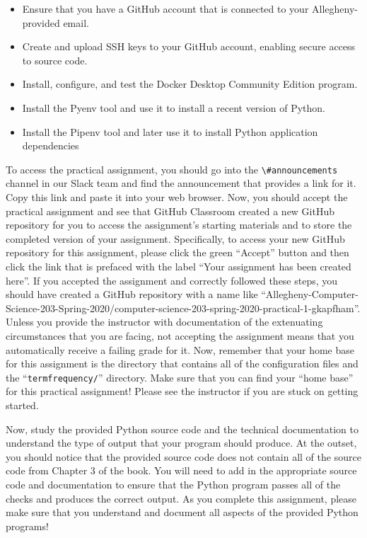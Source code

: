 \documentclass[11pt]{article}
\newcommand{\command}[1]{``\lstinline{#1}''}
\newcommand{\channel}[1]{\lstinline{#1}}
\begin{document}
\begin{itemize}
  \setlength{\itemsep}{0pt}

  \item Ensure that you have a GitHub account that is connected to your
    Allegheny-provided email.

  \item Create and upload SSH keys to your GitHub account, enabling secure
    access to source code.

  \item Install, configure, and test the Docker Desktop Community
    Edition program.

  \item Install the Pyenv tool and use it to install a recent version of Python.

  \item Install the Pipenv tool and later use it to install Python application
    dependencies

\end{itemize}

To access the practical assignment, you should go into the
\channel{\#announcements} channel in our Slack team and find the announcement
that provides a link for it. Copy this link and paste it into your web browser.
Now, you should accept the practical assignment and see that GitHub Classroom
created a new GitHub repository for you to access the assignment's starting
materials and to store the completed version of your assignment. Specifically,
to access your new GitHub repository for this assignment, please click the green
``Accept'' button and then click the link that is prefaced with the label ``Your
assignment has been created here''. If you accepted the assignment and correctly
followed these steps, you should have created a GitHub repository with a name
like
``Allegheny-Computer-Science-203-Spring-2020/computer-science-203-spring-2020-practical-1-gkapfham''.
Unless you provide the instructor with documentation of the extenuating
circumstances that you are facing, not accepting the assignment means that you
automatically receive a failing grade for it. Now, remember that your home base
for this assignment is the directory that contains all of the configuration
files and the \command{termfrequency/} directory. Make sure that you can find
your ``home base'' for this practical assignment! Please see the instructor if
you are stuck on getting started.

Now, study the provided Python source code and the technical documentation to
understand the type of output that your program should produce.
%
At the outset, you should notice that the provided source code does not contain
all of the source code from Chapter 3 of the book. You will need to add in the
appropriate source code and documentation to ensure that the Python program
passes all of the checks and produces the correct output. As you complete this
assignment, please make sure that you understand and document all aspects of the
provided Python programs!
\end{document}
